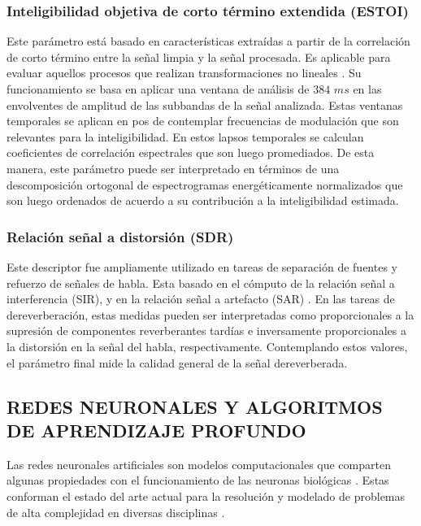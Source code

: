 \subsubsection{Inteligibilidad objetiva de corto término extendida (ESTOI)}
Este parámetro está basado en características extraídas a partir de la correlación de corto término entre la señal limpia y la señal procesada. Es aplicable para evaluar aquellos procesos que realizan transformaciones no lineales \cite{ESTOI}. Su funcionamiento se basa en aplicar una ventana de análisis de $384$ $ms$ en las envolventes de amplitud de las subbandas de la señal analizada. Estas ventanas temporales se aplican en pos de contemplar frecuencias de modulación que son relevantes para la inteligibilidad. En estos lapsos temporales se calculan coeficientes de correlación espectrales que son luego promediados. De esta manera, este parámetro puede ser interpretado en términos de una descomposición ortogonal de espectrogramas energéticamente normalizados que son luego ordenados de acuerdo a su contribución a la inteligibilidad estimada. 

\subsubsection{Relación señal a distorsión (SDR)}

Este descriptor fue ampliamente utilizado en tareas de separación de fuentes y refuerzo de señales de habla. Esta basado en el cómputo de la relación señal a interferencia (SIR), y en la relación señal a artefacto (SAR) \cite{SAR}. En las tareas de dereverberación, estas medidas pueden ser interpretadas como proporcionales a la supresión de componentes reverberantes tardías e inversamente proporcionales a la distorsión en la señal del habla, respectivamente. Contemplando estos valores, el parámetro final mide la calidad general de la señal dereverberada.  

\subsection[Redes neuronales y algoritmos de aprendizaje profundo]{REDES NEURONALES Y ALGORITMOS DE APRENDIZAJE PROFUNDO}
Las redes neuronales artificiales son modelos computacionales que comparten algunas propiedades con el funcionamiento de las neuronas biológicas  \cite{neurona}. Estas conforman el estado del arte actual para la resolución y modelado de problemas de alta complejidad en diversas disciplinas \cite{ANN_intro}. 


